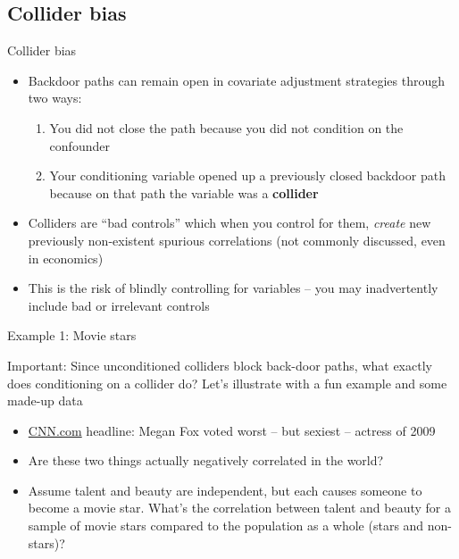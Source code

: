 \subsection{Collider bias}

\begin{frame}{Collider bias}

\begin{itemize}
\item Backdoor paths can remain open in covariate adjustment strategies through two ways:
	\begin{enumerate}
	\item You did not close the path because you did not condition on the confounder
	\item Your conditioning variable opened up a previously closed backdoor path because on that path the variable was a \textbf{collider}
	\end{enumerate}
\item Colliders are ``bad controls'' which when you control for them, \emph{create} new previously non-existent spurious correlations (not commonly discussed, even in economics)
\item This is the risk of blindly controlling for variables -- you may inadvertently include bad or irrelevant controls
\end{itemize}

\end{frame}


\begin{frame}{Example 1: Movie stars}

  \alert{Important}: Since unconditioned colliders block back-door paths, what exactly does conditioning on a collider do? Let's illustrate with a fun example and some made-up data\\
  \begin{itemize}
    \item \underline{CNN.com} headline: Megan Fox voted worst -- but sexiest -- actress of 2009 
    \item Are these two things actually negatively correlated in the world?
    \item Assume talent and beauty are independent, but each causes someone to become a movie star.  What's the correlation between talent and beauty for a sample of movie stars compared to the population as a whole (stars and non-stars)?
  \end{itemize}

\end{frame}


